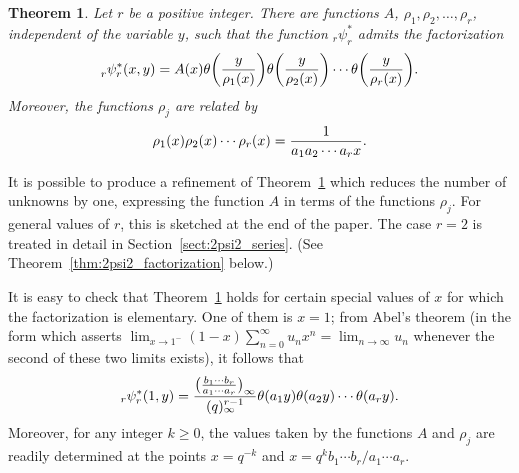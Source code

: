 \documentclass[pdftex]{sigma}
\numberwithin{equation}{section}
\newtheorem{Theorem}{Theorem}[section]
\begin{document}
\begin{Theorem} \label{thm:general_rpsir_factorization}
Let $r$ be a positive integer. There are functions $A$, $\rho_1, \rho_2, \dots, \rho_r$, independent of the variable $y$, such that the function $_r^{}\psi_r^\ast$ admits the factorization
\begin{equation} \label{eqn:general_rpsir_factorization}
_r^{}\psi_r^\ast(x,y) = A(x) \theta\bigg( {y \over \rho_1(x)} \bigg) \theta\bigg( {y \over \rho_2(x)} \bigg) \cdots \theta\bigg( {y \over \rho_r(x)} \bigg).
\end{equation}
Moreover, the functions $\rho_j$ are related by
\begin{equation} \label{eqn:rho_product}
\rho_1(x) \rho_2(x) \cdots \rho_r(x) = {1 \over a_1 a_2 \cdots a_r x}.
\end{equation}
\end{Theorem}

It is possible to produce a refinement of Theorem~\ref{thm:general_rpsir_factorization} which reduces the number of unknowns by one, expressing the function $A$ in terms of the functions $\rho_j$. For general values of $r$, this is sketched at the end of the paper. The case $r=2$ is treated in detail in Section~\ref{sect:2psi2_series}. (See Theorem~\ref{thm:2psi2_factorization} below.)

It is easy to check that Theorem~\ref{thm:general_rpsir_factorization} holds for certain special values of $x$ for which the factorization is elementary. One of them is $x=1$; from Abel's theorem \big(in the form which asserts $\lim_{x \rightarrow 1^-} (1-x)\sum_{n=0}^\infty u_n x^n = \lim_{n \rightarrow \infty} u_n$ whenever the second of these two limits exists\big), it follows that
\begin{equation} \label{eqn:rpsir_factorization_at_x=1}
_r\psi_r^\ast(1,y) = {\bigl({b_1\cdots b_r \over a_1\cdots a_r}\bigr)_\infty \over (q)_\infty^{r-1}} \theta(a_1y) \theta(a_2y) \cdots \theta(a_ry).
\end{equation}
Moreover, for any integer $k \geq 0$, the values taken by the functions $A$ and $\rho_j$ are readily determined at the points $x=q^{-k}$ and $x=q^kb_1\cdots b_r/a_1\cdots a_r$.
\end{document}
